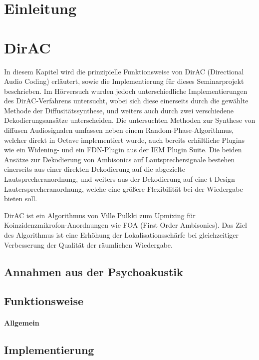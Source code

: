 \documentclass[12pt, a4paper]{article}
\begin{document}
\tableofcontents
\newpage

\section{Einleitung}

\section{DirAC}
In diesem Kapitel wird die prinzipielle Funktionsweise von DirAC (Directional Audio Coding) erläutert, sowie die Implementierung für dieses Seminarprojekt beschrieben. Im Hörversuch wurden jedoch unterschiedliche Implementierungen des DirAC-Verfahrens untersucht, wobei sich diese einerseits durch die gewählte Methode der Diffusitätssynthese, und weiters auch durch zwei verschiedene Dekodierungsansätze unterscheiden. Die untersuchten Methoden zur Synthese von diffusen Audiosignalen umfassen neben einem Random-Phase-Algorithmus, welcher direkt in Octave implementiert wurde, auch bereits erhältliche Plugins wie ein Widening- und ein FDN-Plugin aus der IEM Plugin Suite. Die beiden Ansätze zur Dekodierung von Ambisonics auf Lautsprechersignale bestehen einerseits aus einer direkten Dekodierung auf die abgezielte Lautsprecheranordnung, und weiters aus der Dekodierung auf eine t-Design Lautersprecheranordnung, welche eine größere Flexibilität bei der Wiedergabe bieten soll.

DirAC ist ein Algorithmus von Ville Pulkki \cite{pulkki} zum Upmixing für Koinzidenzmikrofon-Anordnungen wie FOA (First Order Ambisonics). Das Ziel des Algorithmus ist eine Erhöhung der Lokalisationsschärfe bei gleichzeitiger Verbesserung der Qualität der räumlichen Wiedergabe.

\newpage

    \subsection{Annahmen aus der Psychoakustik} \label{annahmen}
    
    \subsection{Funktionsweise}
    
        \paragraph{Allgemein}
        
    \subsection{Implementierung}
    
\end{document}
